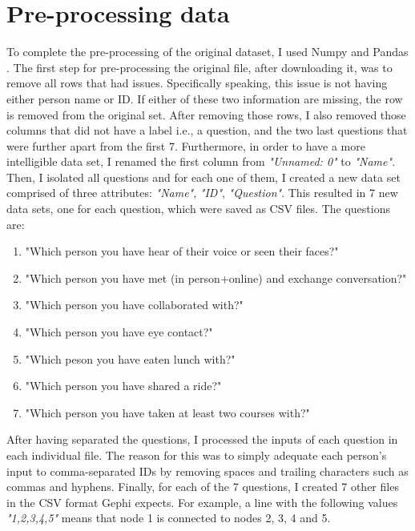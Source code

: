 \section{Pre-processing data}
To complete the pre-processing of the original dataset, I used Numpy \cite{numpycitation} and Pandas \cite{pandascitation}. The first step for pre-processing the original file, after downloading it, was to remove all rows that had issues. Specifically speaking, this issue is not having either person name or ID. If either of these two information are missing, the row is removed from the original set. After removing those rows, I also removed those columns that did not have a label i.e., a question, and the two last questions that were further apart from the first 7. Furthermore, in order to have a more intelligible data set, I renamed the first column from \textit{"Unnamed: 0"} to \textit{"Name"}. Then, I isolated all questions and for each one of them, I created a new data set comprised of three attributes: \textit{"Name"}, \textit{"ID"}, \textit{"Question"}. This resulted in 7 new data sets, one for each question, which were saved as CSV files. The questions are:

\begin{enumerate}
    \item "Which person you have hear of their voice or seen their faces?"
    \item "Which person you have met (in person+online) and exchange conversation?"
    \item "Which person you have collaborated with?"
    \item "Which person you have eye contact?"
    \item "Which peson you have eaten lunch with?"
    \item "Which person you have shared a ride?"
    \item "Which person you have taken at least two courses with?"
\end{enumerate}

After having separated the questions, I processed the inputs of each question in each individual file. The reason for this was to simply adequate each person's input to comma-separated IDs by removing spaces and trailing characters such as commas and hyphens. Finally, for each of the 7 questions, I created 7 other files in the CSV format Gephi \cite{gephicitation} expects. For example, a line with the following values \textit{"1,2,3,4,5"} means that node 1 is connected to nodes 2, 3, 4 and 5.